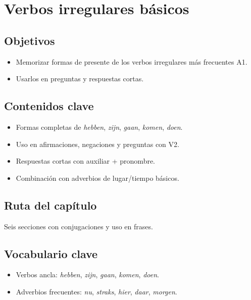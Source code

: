 \chapter{Verbos irregulares básicos}
\section{Objetivos}
\begin{itemize}[leftmargin=*]
	\item Memorizar formas de presente de los verbos irregulares más frecuentes A1.
	\item Usarlos en preguntas y respuestas cortas.
\end{itemize}

\section{Contenidos clave}
\begin{itemize}[leftmargin=*]
	\item Formas completas de \textit{hebben}, \textit{zijn}, \textit{gaan}, \textit{komen}, \textit{doen}.
	\item Uso en afirmaciones, negaciones y preguntas con V2.
	\item Respuestas cortas con auxiliar + pronombre.
	\item Combinación con adverbios de lugar/tiempo básicos.
\end{itemize}

\section{Ruta del capítulo}
Seis secciones con conjugaciones y uso en frases.








\section{Vocabulario clave}
\begin{itemize}[leftmargin=*]
	\item Verbos ancla: \textit{hebben}, \textit{zijn}, \textit{gaan}, \textit{komen}, \textit{doen}.
	\item Adverbios frecuentes: \textit{nu}, \textit{straks}, \textit{hier}, \textit{daar}, \textit{morgen}.
\end{itemize}

